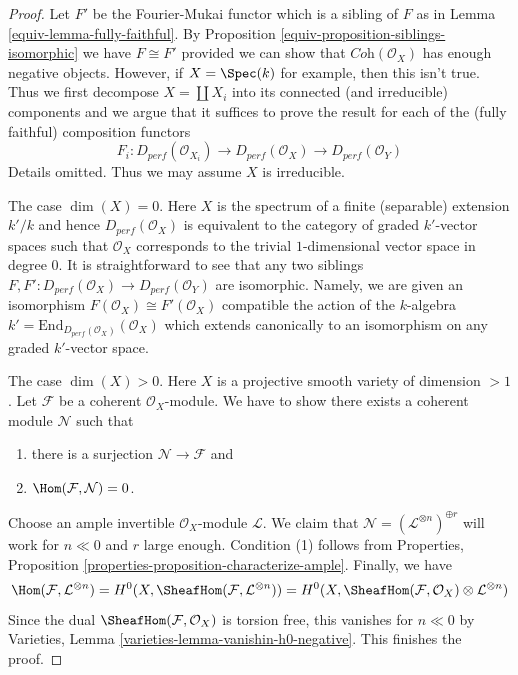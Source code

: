 \begin{proof}

Let $F'$ be the Fourier-Mukai functor which is a sibling of $F$
as in Lemma \ref{equiv-lemma-fully-faithful}.
By Proposition \ref{equiv-proposition-siblings-isomorphic} we have $F \cong F'$
provided we can show that $\textit{Coh}(\mathcal{O}_X)$ has enough
negative objects. However, if $X = \Spec(k)$ for example, then
this isn't true. Thus we first decompose $X = \coprod X_i$
into its connected (and irreducible) components and we
argue that it suffices to prove the result for each of the
(fully faithful) composition functors
$$
F_i :
D_{perf}(\mathcal{O}_{X_i}) \to
D_{perf}(\mathcal{O}_X) \to
D_{perf}(\mathcal{O}_Y)
$$
Details omitted. Thus we may assume $X$ is irreducible.

\medskip\noindent
The case $\dim(X) = 0$. Here $X$ is the spectrum of a finite (separable)
extension $k'/k$ and hence $D_{perf}(\mathcal{O}_X)$
is equivalent to the category
of graded $k'$-vector spaces such that $\mathcal{O}_X$ corresponds to the
trivial $1$-dimensional vector space in degree $0$.
It is straightforward to see that any two
siblings $F, F' : D_{perf}(\mathcal{O}_X) \to D_{perf}(\mathcal{O}_Y)$
are isomorphic. Namely, we are given an isomorphism
$F(\mathcal{O}_X) \cong F'(\mathcal{O}_X)$
compatible the action of the $k$-algebra
$k' = \text{End}_{D_{perf}(\mathcal{O}_X)}(\mathcal{O}_X)$
which extends canonically to an isomorphism on any graded $k'$-vector space.

\medskip\noindent
The case $\dim(X) > 0$. Here $X$ is a projective smooth
variety of dimension $> 1$. Let $\mathcal{F}$ be a coherent
$\mathcal{O}_X$-module. We have to show there exists a
coherent module $\mathcal{N}$ such that
\begin{enumerate}
\item there is a surjection $\mathcal{N} \to \mathcal{F}$ and
\item $\Hom(\mathcal{F}, \mathcal{N}) = 0$.
\end{enumerate}
Choose an ample invertible $\mathcal{O}_X$-module $\mathcal{L}$.
We claim that $\mathcal{N} = (\mathcal{L}^{\otimes n})^{\oplus r}$
will work for $n \ll 0$ and $r$ large enough.
Condition (1) follows from
Properties, Proposition \ref{properties-proposition-characterize-ample}.
Finally, we have
$$
\Hom(\mathcal{F}, \mathcal{L}^{\otimes n}) =
H^0(X, \SheafHom(\mathcal{F}, \mathcal{L}^{\otimes n})) =
H^0(X, \SheafHom(\mathcal{F}, \mathcal{O}_X) \otimes \mathcal{L}^{\otimes n})
$$
Since the dual $\SheafHom(\mathcal{F}, \mathcal{O}_X)$ is torsion free, this
vanishes for $n \ll 0$ by Varieties, Lemma
\ref{varieties-lemma-vanishin-h0-negative}. This finishes the proof.
\end{proof}

